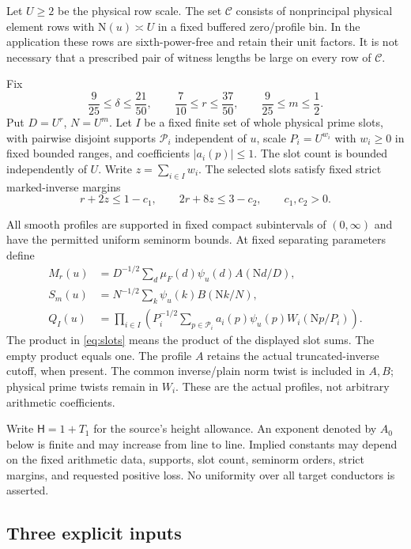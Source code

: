 \documentclass[11pt]{article}
\theoremstyle{definition}
\theoremstyle{remark}
\numberwithin{equation}{section}
\newcommand{\Nm}{\mathrm N}
\newcommand{\CC}{\mathcal C}
\newcommand{\HH}{\mathsf H}
\begin{document}
Let $U\ge2$ be the physical row scale. The set $\CC$ consists of
nonprincipal physical element rows with $\Nm(u)\asymp U$ in a fixed
buffered zero/profile bin. In the application these rows are
sixth-power-free and retain their unit factors. It is not necessary
that a prescribed pair of witness lengths be large on every row of
$\CC$.

Fix
\begin{equation}\label{eq:ranges}
\frac9{25}\le\delta\le\frac{21}{50},\qquad
\frac7{10}\le r\le\frac{37}{50},\qquad
\frac9{25}\le m\le\frac12.
\end{equation}
Put $D=U^r$, $N=U^m$. Let $I$ be a fixed finite set of whole physical
prime slots, with pairwise disjoint supports $\mathcal P_i$ independent
of $u$, scale $P_i=U^{w_i}$ with $w_i\ge0$ in fixed bounded ranges, and
coefficients $|a_i(p)|\le1$. The slot count is bounded independently
of $U$.
Write $z=\sum_{i\in I}w_i$. The selected slots satisfy fixed strict
marked-inverse margins
\begin{equation}\label{eq:widths}
r+2z\le1-c_1,\qquad 2r+8z\le3-c_2,\qquad c_1,c_2>0.
\end{equation}

All smooth profiles are supported in fixed compact subintervals of
$(0,\infty)$ and have the permitted uniform seminorm bounds. At fixed
separating parameters define
\begin{align}
M_r(u)&=D^{-1/2}\sum_d\mu_F(d)\psi_u(d)A(\Nm d/D),\label{eq:inverse}\\
S_m(u)&=N^{-1/2}\sum_k\psi_u(k)B(\Nm k/N),\label{eq:plain}\\
Q_I(u)&=\prod_{i\in I}\left( P_i^{-1/2}
\sum_{p\in\mathcal P_i}a_i(p)\psi_u(p)W_i(\Nm p/P_i)\right).
\label{eq:slots}
\end{align}
The product in \eqref{eq:slots} means the product of the displayed
slot sums. The empty product equals one. The profile $A$ retains the
actual truncated-inverse cutoff, when present. The common inverse/plain
norm twist is included in $A,B$; physical prime twists remain in $W_i$.
These are the actual profiles, not arbitrary arithmetic coefficients.

Write $\HH=1+T_1$ for the source's height allowance. An exponent denoted
by $A_0$ below is finite and may increase from line to line. Implied
constants may depend on the fixed arithmetic data, supports, slot
count, seminorm orders, strict margins, and requested positive loss.
No uniformity over all target conductors is asserted.

\subsection{Three explicit inputs}
\end{document}
